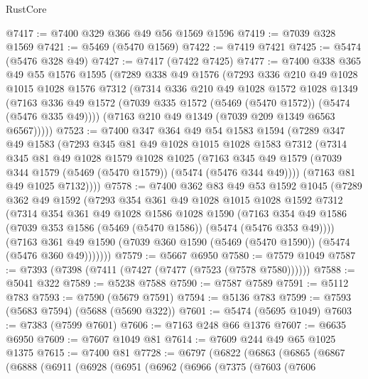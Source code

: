 \begin{lexlean}{RustCore}
\begin{coremodule}
@7417 := @7400 @329 @366 @49 @56 @1569 @1596
@7419 := @7039 @328 @1569
@7421 := @5469 (@5470 @1569)
@7422 := @7419 @7421
@7425 := @5474 (@5476 @328 @49)
@7427 := @7417 (@7422 @7425)
@7477 := @7400
    @338
    @365
    @49
    @55
    @1576
    @1595
    (@7289
      @338
      @49
      @1576
      (@7293
        @336
        @210
        @49
        @1028
        @1015
        @1028
        @1576
        @7312
        (@7314
          @336
          @210
          @49
          @1028
          @1572
          @1028
          @1349
          (@7163 @336 @49 @1572 (@7039 @335 @1572 (@5469 (@5470 @1572)) (@5474 (@5476 @335 @49))))
          (@7163 @210 @49 @1349 (@7039 @209 @1349 @6563 @6567)))))
@7523 := @7400
    @347
    @364
    @49
    @54
    @1583
    @1594
    (@7289
      @347
      @49
      @1583
      (@7293
        @345
        @81
        @49
        @1028
        @1015
        @1028
        @1583
        @7312
        (@7314
          @345
          @81
          @49
          @1028
          @1579
          @1028
          @1025
          (@7163 @345 @49 @1579 (@7039 @344 @1579 (@5469 (@5470 @1579)) (@5474 (@5476 @344 @49))))
          (@7163 @81 @49 @1025 @7132))))
@7578 := @7400
    @362
    @83
    @49
    @53
    @1592
    @1045
    (@7289
      @362
      @49
      @1592
      (@7293
        @354
        @361
        @49
        @1028
        @1015
        @1028
        @1592
        @7312
        (@7314
          @354
          @361
          @49
          @1028
          @1586
          @1028
          @1590
          (@7163 @354 @49 @1586 (@7039 @353 @1586 (@5469 (@5470 @1586)) (@5474 (@5476 @353 @49))))
          (@7163
            @361
            @49
            @1590
            (@7039 @360 @1590 (@5469 (@5470 @1590)) (@5474 (@5476 @360 @49)))))))
@7579 := @5667 @6950
@7580 := @7579 @1049
@7587 := @7393 (@7398 (@7411 (@7427 (@7477 (@7523 (@7578 @7580))))))
@7588 := @5041 @322
@7589 := @5238 @7588
@7590 := @7587 @7589
@7591 := @5112 @783
@7593 := @7590 (@5679 @7591)
@7594 := @5136 @783
@7599 := @7593 (@5683 @7594) (@5688 (@5690 @322))
@7601 := @5474 (@5695 @1049)
@7603 := @7383 (@7599 @7601)
@7606 := @7163 @248 @66 @1376
@7607 := @6635 @6950
@7609 := @7607 @1049 @81
@7614 := @7609 @244 @49 @65 @1025 @1375
@7615 := @7400 @81
@7728 := @6797
    (@6822
      (@6863
        (@6865
          (@6867
            (@6888
              (@6911
                (@6928
                  (@6951
                    (@6962
                      (@6966
                        (@7375
                          (@7603
                            (@7606

\end{coremodule}
\end{lexlean}
